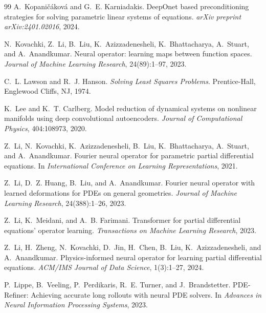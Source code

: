 \documentclass{article}
\begin{document}
\begin{thebibliography}{99}
A.~Kopani\v{c}\'akov\'a and G.~E. Karniadakis.
\newblock DeepOnet based preconditioning strategies for solving
parametric linear systems of equations.
\newblock \emph{arXiv preprint arXiv:2401.02016}, 2024.

N.~Kovachki, Z.~Li, B.~Liu, K.~Azizzadenesheli, K.~Bhattacharya,
A.~Stuart, and A.~Anandkumar.
\newblock Neural operator: learning maps between function spaces.
\newblock \emph{Journal of Machine Learning Research}, 24(89):1--97,
2023.

C.~L. Lawson and R.~J. Hanson.
\newblock \emph{Solving Least Squares Problems}.
\newblock Prentice-Hall, Englewood Cliffs, NJ, 1974.

K.~Lee and K.~T. Carlberg.
\newblock Model reduction of dynamical systems on nonlinear manifolds
using deep convolutional autoencoders.
\newblock \emph{Journal of Computational Physics}, 404:108973, 2020.

Z.~Li, N.~Kovachki, K.~Azizzadenesheli, B.~Liu, K.~Bhattacharya,
A.~Stuart, and A.~Anandkumar.
\newblock Fourier neural operator for parametric partial differential
equations.
\newblock In \emph{International Conference on Learning Representations},
2021.

Z.~Li, D.~Z. Huang, B.~Liu, and A.~Anandkumar.
\newblock Fourier neural operator with learned deformations for PDEs
on general geometries.
\newblock \emph{Journal of Machine Learning Research}, 24(388):1--26,
2023.

Z.~Li, K.~Meidani, and A.~B. Farimani.
\newblock Transformer for partial differential equations' operator
learning.
\newblock \emph{Transactions on Machine Learning Research}, 2023.

Z.~Li, H.~Zheng, N.~Kovachki, D.~Jin, H.~Chen, B.~Liu,
K.~Azizzadenesheli, and A.~Anandkumar.
\newblock Physics-informed neural operator for learning partial
differential equations.
\newblock \emph{ACM/IMS Journal of Data Science}, 1(3):1--27, 2024.

P.~Lippe, B.~Veeling, P.~Perdikaris, R.~E. Turner, and J.~Brandstetter.
\newblock PDE-Refiner: Achieving accurate long rollouts with neural
PDE solvers.
\newblock In \emph{Advances in Neural Information Processing Systems},
2023.


\end{thebibliography}
\end{document}
